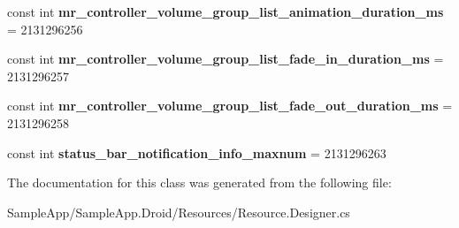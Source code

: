 \begin{DoxyCompactItemize}
\item 
\mbox{\label{class_sample_app_1_1_droid_1_1_resource_1_1_integer_abd780387611ef397dfdf6eb7c3cd5b48}} 
const int {\bfseries mr\+\_\+controller\+\_\+volume\+\_\+group\+\_\+list\+\_\+animation\+\_\+duration\+\_\+ms} = 2131296256
\item 
\mbox{\label{class_sample_app_1_1_droid_1_1_resource_1_1_integer_a5b77b7b24c18c3184d58a2e32de0ea46}} 
const int {\bfseries mr\+\_\+controller\+\_\+volume\+\_\+group\+\_\+list\+\_\+fade\+\_\+in\+\_\+duration\+\_\+ms} = 2131296257
\item 
\mbox{\label{class_sample_app_1_1_droid_1_1_resource_1_1_integer_adf2f811271ae39e030bc29a9eacc4dfd}} 
const int {\bfseries mr\+\_\+controller\+\_\+volume\+\_\+group\+\_\+list\+\_\+fade\+\_\+out\+\_\+duration\+\_\+ms} = 2131296258
\item 
\mbox{\label{class_sample_app_1_1_droid_1_1_resource_1_1_integer_aa2d2a2b97c00eba3cedbef93a2bb4aea}} 
const int {\bfseries status\+\_\+bar\+\_\+notification\+\_\+info\+\_\+maxnum} = 2131296263
\end{DoxyCompactItemize}


The documentation for this class was generated from the following file\+:\begin{DoxyCompactItemize}
\item 
Sample\+App/\+Sample\+App.\+Droid/\+Resources/Resource.\+Designer.\+cs\end{DoxyCompactItemize}

